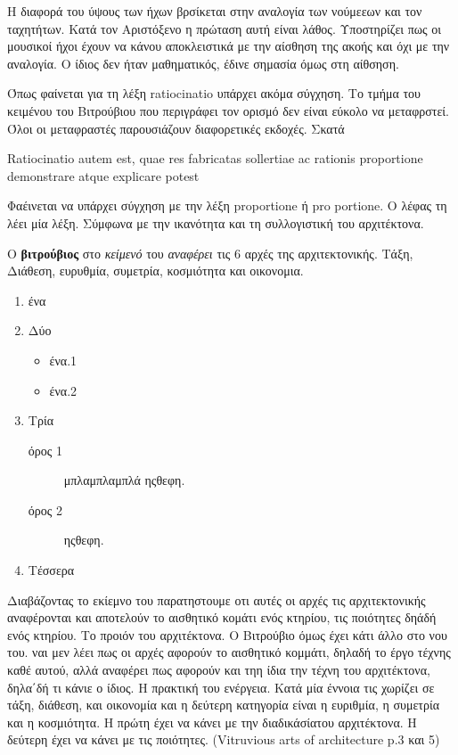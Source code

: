 Η διαφορά του ύψους των ήχων βρσίκεται στην αναλογία των νούμεεων και τον
ταχητήτων. Κατά τον Αριστόξενο η πρώταση αυτή είναι λάθος. Υποστηρίζει πως οι
μουσικοί ήχοι έχουν να κάνου αποκλειστικά με την αίσθηση της ακοής και όχι με
την αναλογία. Ο ίδιος δεν ήταν μαθηματικός, έδινε σημασία όμως στη αίθσηση. 

Όπως φαίνεται για τη λέξη ratiocinatio υπάρχει ακόμα σύγχηση. Το τμήμα του
κειμένου του Βιτρούβιου που περιγράφει τον ορισμό δεν είναι εύκολο να
μεταφρστεί. Όλοι οι μεταφραστές παρουσιάζουν διαφορετικές εκδοχές. Σκατά

Ratiocinatio autem est, quae res fabricatas sollertiae ac rationis proportione
demonstrare atque explicare potest

Φαέινεται να υπάρχει σύγχηση με την λέξη proportione ή pro portione. Ο λέφας
τη λέει μία λέξη. 
Σύμφωνα με την ικανότητα και τη συλλογιστική του αρχιτέκτονα.


  
  Ο {\color{red}\textbf{βιτρούβιος}} στο \emph{κείμενό} του \textit{αναφέρει} τις 6 αρχές της αρχιτεκτονικής. Τάξη, Διάθεση, ευρυθμία, συμετρία, κοσμιότητα και οικονομια. \cite{scranton_vitruvius_1974, vitruvius-lefas}
  
\begin{enumerate}[noitemsep] %
  \item ένα
  \item Δύο
  
  \begin{itemize}
    \item ένα.1
    \item ένα.2
  \end{itemize}
  
  \item Τρία
  
    \begin{description}
      \item[όρος 1] μπλαμπλαμπλά ηςθεφη.
      \item[όρος 2] ηςθεφη.
    \end{description}
  
  \item Τέσσερα
\end{enumerate}

Διαβάζοντας το εκίεμνο του παρατηστουμε οτι αυτές οι αρχές τις αρχιτεκτονικής 
αναφέρονται και αποτελούν το αισθητικό κομάτι ενός κτηρίου, τις ποιότητες δηάδή 
ενός κτηρίου. Το προιόν του αρχιτέκτονα. Ο Βιτρούβιο όμως έχει κάτι άλλο στο 
νου του. ναι μεν λέει πως οι αρχές αφορούν το αισθητικό κομμάτι, δηλαδή το έργο 
τέχνης καθέ αυτού, αλλά αναφέρει πως αφορούν και τηη ίδια την τέχνη του 
αρχιτέκτονα, δηλα΄δή τι κάνιε ο ίδιος. Η πρακτική του ενέργεια. Κατά μία έννοια 
τις χωρίζει σε τάξη, διάθεση, και οικονομία και η δεύτερη κατηγορία είναι η 
ευριθμία, η συμετρία και η κοσμιότητα. Η πρώτη έχει να κάνει με την 
διαδικάσίατου αρχιτέκτονα. Η δεύτερη έχει να κάνει με τις ποιότητες. 
(Vitruvious arts of architecture p.3 και 5)
  
